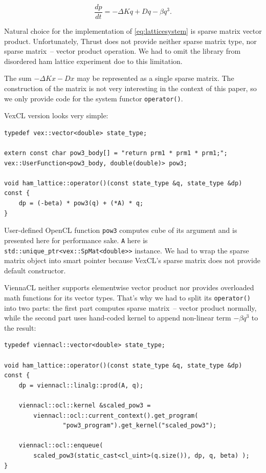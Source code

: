 \documentclass[1p]{elsarticle}
\newcommand{\code}[1]{\lstinline|#1|}
\begin{document}
\begin{equation} \label{eq:latticesystem}
    \frac{dp}{dt} = -\Delta Kq + Dq - \beta q^3.
\end{equation}

Natural choice for the implementation of \eqref{eq:latticesystem} is sparse
matrix vector product. Unfortunately, Thrust does not provide neither sparse
matrix type, nor sparse matrix~-- vector product operation.
We had to omit the library from disordered ham lattice experiment doe to this
limitation.

The sum $-\Delta Kx-Dx$ may be represented as a single sparse matrix. The
construction of the matrix is not very interesting in the context of this
paper, so we only provide code for the system functor \code{operator()}.

VexCL version looks very simple:
\begin{lstlisting}[frame=leftline]
typedef vex::vector<double> state_type;

extern const char pow3_body[] = "return prm1 * prm1 * prm1;";
vex::UserFunction<pow3_body, double(double)> pow3;

void ham_lattice::operator()(const state_type &q, state_type &dp) const {
    dp = (-beta) * pow3(q) + (*A) * q;
}
\end{lstlisting}

User-defined OpenCL function \code{pow3} computes cube of its argument and is
presented here for performance sake. \code{A} here is
\code{std::unique_ptr<vex::SpMat<double>>} instance. We had to wrap the sparse
matrix object into smart pointer because VexCL's sparse matrix does not provide
default constructor.

ViennaCL neither supports elementwise vector product nor provides
overloaded math functions for its vector types. That's why we had to split its
\code{operator()} into two parts: the first part computes sparse matrix~--
vector product normally, while the second part uses hand-coded kernel to append
non-linear term $-\beta q^3$ to the result:
\begin{lstlisting}[frame=leftline]
typedef viennacl::vector<double> state_type;

void ham_lattice::operator()(const state_type &q, state_type &dp) const {
    dp = viennacl::linalg::prod(A, q);

    viennacl::ocl::kernel &scaled_pow3 =
        viennacl::ocl::current_context().get_program(
                "pow3_program").get_kernel("scaled_pow3");

    viennacl::ocl::enqueue(
        scaled_pow3(static_cast<cl_uint>(q.size()), dp, q, beta) );
}
\end{lstlisting}
\end{document}
